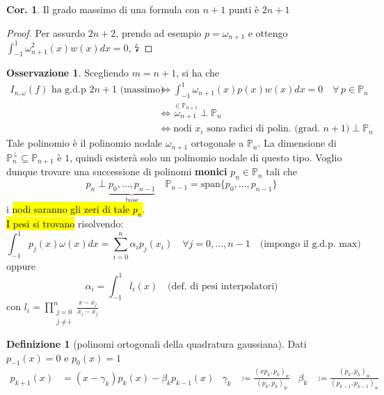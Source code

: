 \documentclass[a4paper,10pt]{article}
\theoremstyle{definition}
\theoremstyle{indentdefinition}
\newtheorem{defn}{Definizione}[section]
\theoremstyle{indenttheorem}
\newtheorem{cor}{Cor.}
\theoremstyle{myremark}
\newtheorem*{rem*}{Osservazione}
\theoremstyle{indentgeneral}
\theoremstyle{plain}
\theoremstyle{plain}
\newenvironment{myboxed} 
{\noindent\begin{lrbox}{\mybox}\begin{minipage}{\textwidth}}
{\end{minipage}\end{lrbox}\fbox{\usebox{\mybox}}}
\begin{document}
\begin{myboxed}
\begin{cor}
Il grado massimo di una formula con $n+1$ punti è $2n+1$
\end{cor}
\end{myboxed}

\begin{proof}
Per assurdo $2n+2$, prendo ad esempio $p=\omega_{n+1}$ e ottengo
$\int_{-1}^{1}\omega_{n+1}^{2}\left(x\right)w\left(x\right)dx=0$,
$\text{\lightning}$
\end{proof}

\begin{myboxed}
\begin{rem*}
Scegliendo $m=n+1$, si ha che 
\begin{align*}
    I_{n,\omega}(f) \text{ ha g.d.p } 2n+1 \text{ (massimo)} &\iff \int_{-1}^{1}\omega_{n+1}\left(x\right)p\left(x\right)w\left(x\right)dx=0\quad\forall\,p\in\mathbb{P}_{n} \\
     &\iff \overset{\in\mathbb{P}_{n+1}}{\omega_{n+1}}\perp \mathbb{P}_n \\
     &\iff \text{nodi } x_i \text{ sono radici di polin. (grad. $n+1$)} \perp \mathbb{P}_n
\end{align*}
Tale polinomio è il polinomio nodale $\omega_{n+1}$ ortogonale a $\mathbb{P}_{n}$. La dimensione di $\mathbb{P}_{n}^{\perp}\subseteq \mathbb{P}_{n+1}$ è $1$, quindi esisterà solo un polinomio nodale di questo tipo. Voglio dunque trovare una
successione di polinomi \textbf{monici} $p_n\in\mathbb{P}_n$ tali che $$p_{n}\perp \underbrace{p_{0},\ldots,p_{n-1}}_{\text{base}} \quad \mathbb{P}_{n-1}=\text{span}\{p_{0},\ldots,p_{n-1}\} $$
i \hl{nodi saranno gli zeri di tale $p_n$}. \\
\hl{I pesi si trovano} risolvendo:
$$\int_{-1}^1p_j(x)\omega(x)dx=\sum_{i=0}^{n}\alpha_ip_j(x_i) \quad \forall j=0,\dots, n-1  \quad \text{(impongo il g.d.p. max)}$$
oppure
$$\alpha_i=\int_{-1}^1l_i(x) \quad \text{(def. di pesi interpolatori)}$$
con $l_i=\prod_{\substack{j=0\\
j\neq i}}^{n}\frac{x-x_{j}}{x_{i}-x_{j}}$
\end{rem*}
\end{myboxed}

\begin{defn}[polinomi ortogonali della quadratura gaussiana]
Dati $p_{-1}\left(x\right)=0$ e $p_{0}\left(x\right)=1$
\begin{align*}
p_{k+1}\left(x\right) & =\left(x-\gamma_{k}\right)p_{k}\left(x\right)-\beta_{k}p_{k-1}\left(x\right) & \gamma_{k} & \coloneqq\frac{\left(xp_{k},p_{k}\right)_{w}}{\left(p_{k},p_{k}\right)_{w}} & \beta_{k} & \coloneqq\frac{\left(p_{k},p_{k}\right)_{w}}{\left(p_{k-1},p_{k-1}\right)_{w}}
\end{align*}
\end{defn}
\end{document}
